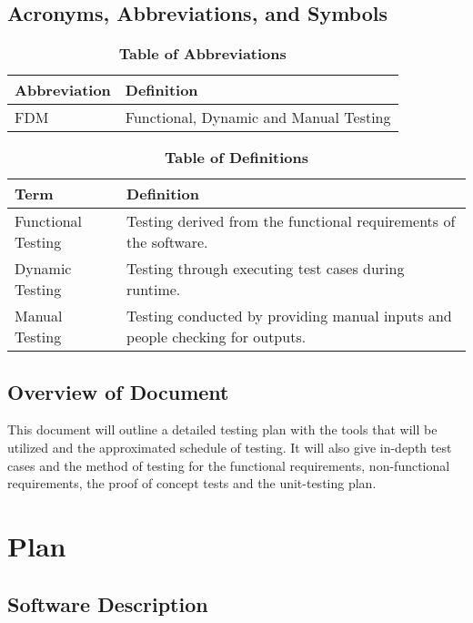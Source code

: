\documentclass[12pt, titlepage]{article}
\begin{document}
\subsection{Acronyms, Abbreviations, and Symbols}
	
\begin{table}[hbp]
\caption{\textbf{Table of Abbreviations}} \label{Abbrev}

\begin{tabularx}{\textwidth}{p{3cm}X}
\toprule
\textbf{Abbreviation} & \textbf{Definition} \\
\midrule
FDM & Functional, Dynamic and Manual Testing\\
\bottomrule
\end{tabularx}

\end{table}

\begin{table}[!htbp]
\caption{\textbf{Table of Definitions}} \label{Defs}

\begin{tabularx}{\textwidth}{p{3cm}X}
\toprule
\textbf{Term} & \textbf{Definition}\\
\midrule
Functional Testing & Testing derived from the functional requirements of the software.\\
Dynamic Testing & Testing through executing test cases during runtime.\\
Manual Testing & Testing conducted by providing manual inputs and people checking for outputs.\\
\bottomrule
\end{tabularx}

\end{table}	

\subsection{Overview of Document}

This document will outline a detailed testing plan with the tools that will be utilized and the approximated schedule of testing. It will also give in-depth test cases and the method of testing for the functional requirements, non-functional requirements, the proof of concept tests and the unit-testing plan.

\section{Plan}
	
\subsection{Software Description}
\end{document}
